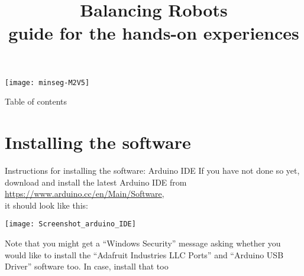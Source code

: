 \newif	\ifexternalize					%
\newif	\ifshowonlynotes				%
\newif	\ifhandout						%
\newif	\ifshowsolutions				%
\newif	\ifshownotes					%
\ifdefined\EXTERNALIZE	\externalizetrue	\fi						%
\ifdefined\ONLYNOTES	\showonlynotestrue	\fi						%
\ifdefined\HANDOUT		\handouttrue		\fi						%
\ifdefined\SOLUTIONS	\showsolutionstrue	\fi						%
\ifdefined\NOTES		\shownotestrue		\fi						%
\title		[Balancing Robots]	{Balancing Robots \\ guide for the hands-on experiences}
\date		{} %


\begin{frame}
	\titlepage
	\vspace{-1.9cm} 
	\begin{center}
		\texttt{[image: minseg-M2V5]}
	\end{center}
\end{frame}


\begin{frame}{Table of contents}
	\tableofcontents
\end{frame}


\section{Installing the software}


\begin{frame}[t]{Instructions for installing the software: Arduino IDE}
	If you have not done so yet, download and install the latest Arduino IDE from \url{https://www.arduino.cc/en/Main/Software}, \\ it should look like this:
	\begin{center}
		\texttt{[image: Screenshot\_arduino\_IDE]}
	\end{center}
	Note that you might get a ``Windows Security'' message asking whether you would like to install the ``Adafruit Industries LLC Ports'' and ``Arduino USB Driver'' software too. In case, install that too
\end{frame}


